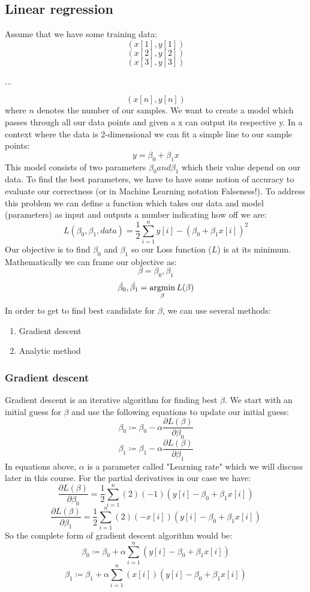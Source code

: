 \documentclass[12pt]{article}
\newcommand{\argmin}{\operatornamewithlimits{argmin}}
\begin{document}
\subsection{Linear regression}
Assume that we have some training data: 
$$(x[1],y[1])$$
$$(x[2],y[2])$$
$$(x[3],y[3])$$
{\centering...\par}
$$(x[n],y[n])$$
where $n$ denotes the number of our samples. We want to create a model which passes through all our data points and given a x can output its respective y. In a context where the data is 2-dimensional we can fit a simple line to our sample points:$$y=\beta_0 + \beta_1 x$$
This model consists of two parameters $\beta_0 and \beta_1$ which their value depend on our data. To find the best parameters, we have to have some notion of accuracy to evaluate our correctness (or in Machine Learning notation Falseness!). To address this problem we can define a function which takes our data and model (parameters) as input and outputs a number indicating how off we are:$$L(\beta_0,\beta_1, data) = \frac{1}{2} \sum_{i=1}^{n} y[i]-(\beta_0 + \beta_1 x[i])^2$$
Our objective is to find $\beta_0$ and $\beta_1$ so our Loss function ($L$) is at its minimum. Mathematically we can frame our objective as: 
$$\beta = \beta_0, \beta_1$$
$$ \hat{\beta_0}, \hat{\beta_1} = \argmin_\beta {L}(\beta)$$
In order to get to find best candidate for $\beta$, we can use several methods:
\begin{enumerate}
\item Gradient descent
\item Analytic method
\end{enumerate}
\subsubsection{Gradient descent}
Gradient descent is an iterative algorithm for finding best $\beta$. We start with an initial guess for $\beta$ and use the following equations to update our initial guess:
$$\beta_0 \coloneqq \beta_0 - \alpha \frac{\partial L(\beta)}{\partial \beta_0}$$
$$\beta_1 \coloneqq \beta_1 - \alpha \frac{\partial L(\beta)}{\partial \beta_1}$$
In equations above, $\alpha$ is a parameter called "Learning rate" which we will discuss later in this course. For the partial derivatives in our case we have:
$$\frac{\partial L(\beta)}{\partial \beta_0} = \frac{1}{2} \sum_{i=1}^{n} (2) (-1) (y[i]-\beta_0 + \beta_1 x[i])$$
$$\frac{\partial L(\beta)}{\partial \beta_1} = \frac{1}{2} \sum_{i=1}^{n} (2) (-x[i]) (y[i]-\beta_0 + \beta_1 x[i])$$
So the complete form of gradient descent algorithm would be:
$$\beta_0 \coloneqq \beta_0 + \alpha \sum_{i=1}^{n} (y[i]-\beta_0 + \beta_1 x[i])$$
$$\beta_1 \coloneqq \beta_1 + \alpha \sum_{i=1}^{n} (x[i]) (y[i]-\beta_0 + \beta_1 x[i])$$
\end{document}
